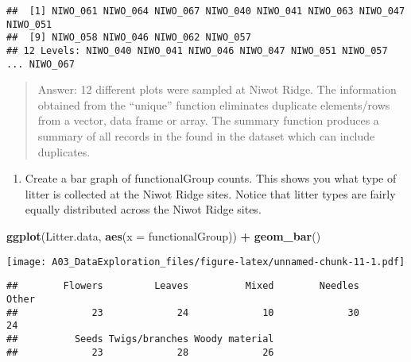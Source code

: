 \documentclass[]{article}
\newenvironment{Shaded}{\begin{snugshade}}{\end{snugshade}}
\newcommand{\DataTypeTok}[1]{\textcolor[rgb]{0.13,0.29,0.53}{#1}}
\newcommand{\KeywordTok}[1]{\textcolor[rgb]{0.13,0.29,0.53}{\textbf{#1}}}
\newcommand{\NormalTok}[1]{#1}
\newcommand{\OperatorTok}[1]{\textcolor[rgb]{0.81,0.36,0.00}{\textbf{#1}}}
\newcommand{\StringTok}[1]{\textcolor[rgb]{0.31,0.60,0.02}{#1}}
\providecommand{\tightlist}{%
  \setlength{\itemsep}{0pt}\setlength{\parskip}{0pt}}
\begin{document}
\begin{verbatim}
##  [1] NIWO_061 NIWO_064 NIWO_067 NIWO_040 NIWO_041 NIWO_063 NIWO_047 NIWO_051
##  [9] NIWO_058 NIWO_046 NIWO_062 NIWO_057
## 12 Levels: NIWO_040 NIWO_041 NIWO_046 NIWO_047 NIWO_051 NIWO_057 ... NIWO_067
\end{verbatim}

\begin{quote}
Answer: 12 different plots were sampled at Niwot Ridge. The information
obtained from the ``unique'' function eliminates duplicate elements/rows
from a vector, data frame or array. The summary function produces a
summary of all records in the found in the dataset which can include
duplicates.
\end{quote}

\begin{enumerate}
\def\labelenumi{\arabic{enumi}.}
\setcounter{enumi}{13}
\tightlist
\item
  Create a bar graph of functionalGroup counts. This shows you what type
  of litter is collected at the Niwot Ridge sites. Notice that litter
  types are fairly equally distributed across the Niwot Ridge sites.
\end{enumerate}

\begin{Shaded}
\begin{Highlighting}[]
\KeywordTok{ggplot}\NormalTok{(Litter.data, }\KeywordTok{aes}\NormalTok{(}\DataTypeTok{x =}\NormalTok{ functionalGroup)) }\OperatorTok{+}
\StringTok{  }\KeywordTok{geom_bar}\NormalTok{()}
\end{Highlighting}
\end{Shaded}

\texttt{[image: A03\_DataExploration\_files/figure-latex/unnamed-chunk-11-1.pdf]}

\begin{Shaded}
\end{Shaded}

\begin{verbatim}
##        Flowers         Leaves          Mixed        Needles          Other 
##             23             24             10             30             24 
##          Seeds Twigs/branches Woody material 
##             23             28             26
\end{verbatim}
\end{document}
